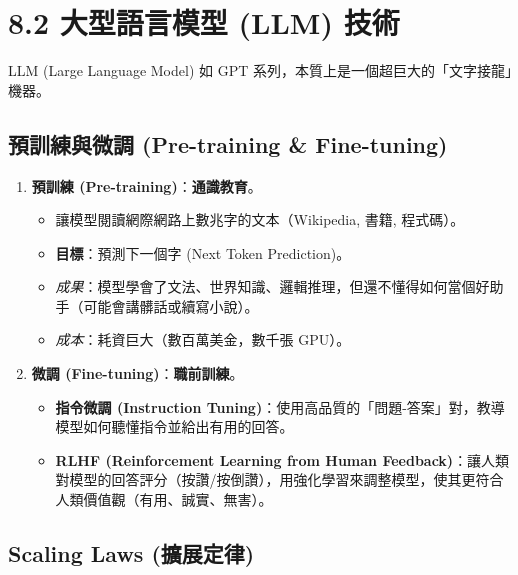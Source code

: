 \documentclass[
  letterpaper,
  DIV=11,
  numbers=noendperiod]{scrreprt}
\providecommand{\tightlist}{%
  \setlength{\itemsep}{0pt}\setlength{\parskip}{0pt}}
\begin{document}
\chapter{8.2 大型語言模型 (LLM) 技術}\label{sec-llm-tech}

LLM (Large Language Model) 如 GPT
系列，本質上是一個超巨大的「文字接龍」機器。

\section{預訓練與微調 (Pre-training \&
Fine-tuning)}\label{sec-pretrain-finetune}

\begin{enumerate}
\def\labelenumi{\arabic{enumi}.}
\tightlist
\item
  \textbf{預訓練 (Pre-training)}：\textbf{通識教育}。

  \begin{itemize}
  \tightlist
  \item
    讓模型閱讀網際網路上數兆字的文本（Wikipedia, 書籍, 程式碼）。
  \item
    \textbf{目標}：預測下一個字 (Next Token Prediction)。
  \item
    \emph{成果}：模型學會了文法、世界知識、邏輯推理，但還不懂得如何當個好助手（可能會講髒話或續寫小說）。
  \item
    \emph{成本}：耗資巨大（數百萬美金，數千張 GPU）。
  \end{itemize}
\item
  \textbf{微調 (Fine-tuning)}：\textbf{職前訓練}。

  \begin{itemize}
  \tightlist
  \item
    \textbf{指令微調 (Instruction
    Tuning)}：使用高品質的「問題-答案」對，教導模型如何聽懂指令並給出有用的回答。
  \item
    \textbf{RLHF (Reinforcement Learning from Human
    Feedback)}：讓人類對模型的回答評分（按讚/按倒讚），用強化學習來調整模型，使其更符合人類價值觀（有用、誠實、無害）。
  \end{itemize}
\end{enumerate}

\section{Scaling Laws (擴展定律)}\label{sec-scaling-laws}
\end{document}
